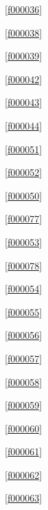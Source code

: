 \noindent\filesourcenumbernameone\ \ref{f000036}\dotfill\pageref{f000036}%

\noindent\filesourcenumbernameone\ \ref{f000038}\dotfill\pageref{f000038}%

\noindent\filesourcenumbernameone\ \ref{f000039}\dotfill\pageref{f000039}%

\noindent\filesourcenumbernameone\ \ref{f000042}\dotfill\pageref{f000042}%

\noindent\filesourcenumbernameone\ \ref{f000043}\dotfill\pageref{f000043}%

\noindent\filesourcenumbernameone\ \ref{f000044}\dotfill\pageref{f000044}%

\noindent\filesourcenumbernameone\ \ref{f000051}\dotfill\pageref{f000051}%

\noindent\filesourcenumbernameone\ \ref{f000052}\dotfill\pageref{f000052}%

\noindent\filesourcenumbernameone\ \ref{f000050}\dotfill\pageref{f000050}%

\noindent\filesourcenumbernameone\ \ref{f000077}\dotfill\pageref{f000077}%

\noindent\filesourcenumbernameone\ \ref{f000053}\dotfill\pageref{f000053}%

\noindent\filesourcenumbernameone\ \ref{f000078}\dotfill\pageref{f000078}%

\noindent\filesourcenumbernameone\ \ref{f000054}\dotfill\pageref{f000054}%

\noindent\filesourcenumbernameone\ \ref{f000055}\dotfill\pageref{f000055}%

\noindent\filesourcenumbernameone\ \ref{f000056}\dotfill\pageref{f000056}%

\noindent\filesourcenumbernameone\ \ref{f000057}\dotfill\pageref{f000057}%

\noindent\filesourcenumbernameone\ \ref{f000058}\dotfill\pageref{f000058}%

\noindent\filesourcenumbernameone\ \ref{f000059}\dotfill\pageref{f000059}%

\noindent\filesourcenumbernameone\ \ref{f000060}\dotfill\pageref{f000060}%

\noindent\filesourcenumbernameone\ \ref{f000061}\dotfill\pageref{f000061}%

\noindent\filesourcenumbernameone\ \ref{f000062}\dotfill\pageref{f000062}%

\noindent\filesourcenumbernameone\ \ref{f000063}\dotfill\pageref{f000063}%

